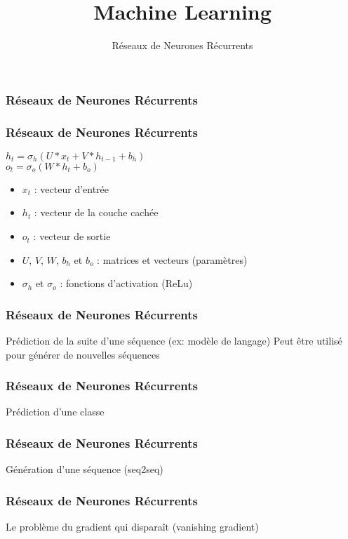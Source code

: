 \documentclass{formation}
\title{Machine Learning}
\subtitle{Réseaux de Neurones Récurrents}
\begin{document}
\maketitle

\begin{frame}
  \frametitle{Réseaux de Neurones Récurrents}
\end{frame}

\begin{frame}
  \frametitle{Réseaux de Neurones Récurrents}
  $h_{t}=\sigma_{h}(U*x_{t}+V*h_{t-1}+b_{h})$ \\
  $o_{t}=\sigma_{o}(W*h_{t}+b_{o})$ \\
  \begin{itemize}
  \item $x_{t}$ : vecteur d'entrée
  \item $h_t$ : vecteur de la couche cachée
  \item $o_{t}$ : vecteur de sortie
  \item $U$, $V$, $W$, $b_h$ et $b_o$ : matrices et vecteurs (paramètres)
  \item $\sigma_{h}$ et $\sigma_o$ : fonctions d'activation (ReLu)
  \end{itemize}
\end{frame}

\begin{frame}
  \frametitle{Réseaux de Neurones Récurrents}
  Prédiction de la suite d'une séquence (ex: modèle de langage)
  Peut être utilisé pour générer de nouvelles séquences
\end{frame}

\begin{frame}
  \frametitle{Réseaux de Neurones Récurrents}
  Prédiction d'une classe
\end{frame}

\begin{frame}
  \frametitle{Réseaux de Neurones Récurrents}
  Génération d'une séquence (seq2seq)
\end{frame}

\begin{frame}
  \frametitle{Réseaux de Neurones Récurrents}
  Le problème du gradient qui disparaît (vanishing gradient)
\end{frame}
\end{document}
